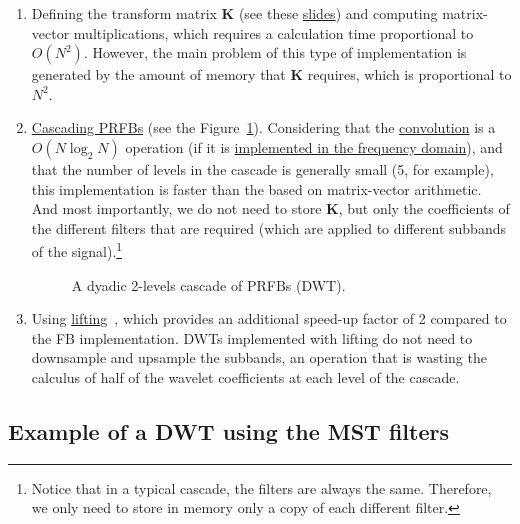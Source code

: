\begin{enumerate}

\item Defining the transform matrix ${\mathbf K}$ (see these
  \href{https://cseweb.ucsd.edu/classes/fa17/cse166-a/lec13.pdf}{slides})
  and computing matrix-vector multiplications, which requires a
  calculation time proportional to $O(N^2)$. However, the main problem
  of this type of implementation is generated by the amount of memory
  that ${\mathbf K}$ requires, which is proportional to $N^2$.

\item
  \href{https://en.wikipedia.org/wiki/Discrete_wavelet_transform#Cascading_and_filter_banks}{Cascading
    PRFBs} (see the Figure~\ref{fig:cascade}). Considering that the
  \href{https://en.wikipedia.org/wiki/Convolution}{convolution} is a
  $O(N\log_2N)$ operation (if it is
  \href{https://en.wikipedia.org/wiki/Convolution_theorem}{implemented
    in the frequency domain}), and that the number of levels in the
  cascade is generally small (5, for example), this implementation is
  faster than the based on matrix-vector arithmetic. And most
  importantly, we do not need to store ${\mathbf K}$, but only the
  coefficients of the different filters that are required (which are
  applied to different subbands of the signal).\footnote{Notice that
  in a typical cascade, the filters are always the same. Therefore, we
  only need to store in memory only a copy of each different filter.}

\begin{figure}
  \centering
  \caption{A dyadic 2-levels cascade of PRFBs (DWT).}
  \label{fig:cascade}
\end{figure}

\item Using
  \href{https://en.wikipedia.org/wiki/Lifting_scheme}{lifting}~\cite{sweldens1997building},
  which provides an additional speed-up factor of 2 compared to the FB
  implementation. DWTs implemented with lifting do not need to
  downsample and upsample the subbands, an operation that is wasting
  the calculus of half of the wavelet coefficients at each level of
  the cascade.

\end{enumerate}


\subsection{Example of a DWT using the MST filters}

